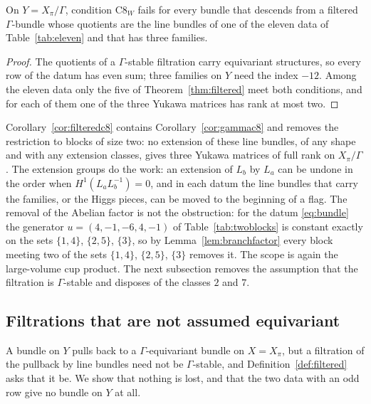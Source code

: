 \begin{corollary}\label{cor:filteredc8}
On $Y=X_\pi/\Gamma$, condition $\mathrm{C8}_W$ fails for every bundle that
descends from a filtered $\Gamma$-bundle whose quotients are the line
bundles of one of the eleven data of Table~\ref{tab:eleven} and that has
three families.
\end{corollary}
\begin{proof}
The quotients of a $\Gamma$-stable filtration carry equivariant
structures, so every row of the datum has even sum; three families on $Y$
need the index $-12$. Among the eleven data only the five of
Theorem~\ref{thm:filtered} meet both conditions, and for each of them one
of the three Yukawa matrices has rank at most two.
\end{proof}

\begin{remark}\label{rem:filteredscope}
Corollary~\ref{cor:filteredc8} contains Corollary~\ref{cor:gammac8} and
removes the restriction to blocks of size two: no extension of these line
bundles, of any shape and with any extension classes, gives three Yukawa
matrices of full rank on $X_\pi/\Gamma$. The extension groups do the
work: an extension of $L_b$ by $L_a$ can be undone in the order when
$H^1(L_aL_b^{-1})=0$, and in each datum the line bundles that carry the
families, or the Higgs pieces, can be moved to the beginning of a flag.
The removal of the Abelian factor is not the obstruction: for the datum
\eqref{eq:bundle} the generator $u=(4,-1,-6,4,-1)$ of
Table~\ref{tab:twoblocks} is constant exactly on the sets $\{1,4\}$,
$\{2,5\}$, $\{3\}$, so by Lemma~\ref{lem:branchfactor} every block meeting two of the sets
$\{1,4\}$, $\{2,5\}$, $\{3\}$ removes it. The scope is again the
large-volume cup product. The next subsection removes the assumption
that the filtration is $\Gamma$-stable and disposes of the classes $2$
and $7$.
\end{remark}

\subsection{Filtrations that are not assumed equivariant}\label{sec:nonequivariant}
A bundle on $Y$ pulls back to a $\Gamma$-equivariant bundle on $X=X_\pi$,
but a filtration of the pullback by line bundles need not be
$\Gamma$-stable, and Definition~\ref{def:filtered} asks that it be. We
show that nothing is lost, and that the two data with an odd row give no
bundle on $Y$ at all.


